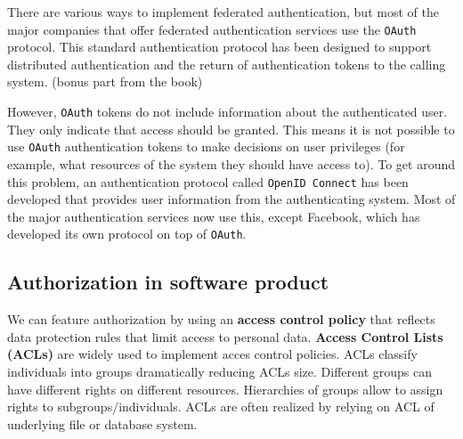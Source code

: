 There are various ways to implement federated authentication, but most of the major companies that offer federated authentication services use the \texttt{OAuth} protocol. This standard authentication protocol has been designed to support distributed authentication and the return of authentication tokens to the calling system.
(bonus part from the book)

However, \texttt{OAuth} tokens do not include information about the authenticated user. They only indicate that access should be granted. This means it is not possible to use \texttt{OAuth} authentication tokens to make decisions on user privileges (for example, what resources of the system they should have access to). To get around this problem, an authentication protocol called \texttt{OpenID Connect} has been developed that provides user information from the authenticating system. Most of the major authentication services now use this, except Facebook, which has developed its own protocol on top of \texttt{OAuth}.

\subsection{Authorization in software product}
We can feature authorization by using an \textbf{access control policy} that reflects data protection rules that limit access to personal data. \textbf{Access Control Lists (ACLs)} are widely used to implement acces control policies. ACLs classify individuals into groups dramatically reducing ACLs size. Different groups can have different rights on different resources. Hierarchies of groups allow to assign rights to subgroups/individuals. ACLs are often realized by relying on ACL of underlying file or database system.


